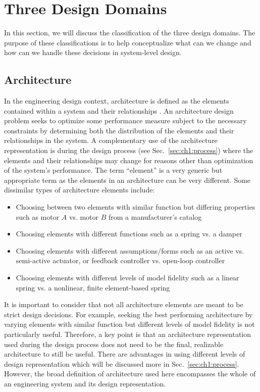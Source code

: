 \section{Three Design Domains\label{sec:ch1:domains}}

In this section, we will discuss the classification of the three design domains.
The purpose of these classifications is to help conceptualize what can we change and how can we handle these decisions in system-level design.

\subsection{Architecture\label{sec:ch1:architecture}}

In the engineering design context, architecture is defined as the elements contained within a system and their relationships \cite{Crawley2004a}.
An architecture design problem seeks to optimize some performance measure subject to the necessary constraints by determining both the distribution of the elements and their relationships in the system.
A complementary use of the architecture representation is during the design process (see Sec.~\ref{sec:ch1:process}) where the elements and their relationships may change for reasons other than optimization of the system's performance.
The term ``element'' is a very generic but appropriate term as the elements in an architecture can be very different.
Some dissimilar types of architecture elements include:
\begin{itemize}[noitemsep]
\item Choosing between two elements with similar function but differing properties such as motor $A$ vs. motor $B$ from a manufacturer's catalog
\item Choosing elements with different functions such as a spring vs. a damper
\item Choosing elements with different assumptions/forms such as an active vs. semi-active actuator, or feedback controller vs. open-loop controller
\item Choosing elements with different levels of model fidelity such as a linear spring vs. a nonlinear, finite element-based spring
\end{itemize}

It is important to consider that not all architecture elements are meant to be strict design decisions.
For example, seeking the best performing architecture by varying elements with similar function but different levels of model fidelity is not particularly useful.
Therefore, a key point is that an architecture representation used during the design process does not need to be the final, realizable architecture to still be useful.
There are advantages in using different levels of design representation which will be discussed more in Sec.~\ref{sec:ch1:process}.
However, the broad definition of architecture used here encompasses the whole of an engineering system and its design representation.


